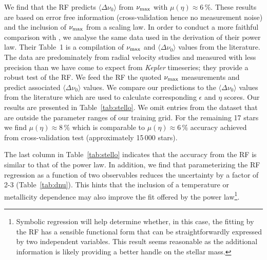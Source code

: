 We find that the RF predicts $\langle\Delta\nu_0\rangle$  from $\nu_{\rm{max}}$  with $\mu (\eta) \approx 6\,\%$. These results are based on error free information (cross-validation hence no measurement noise) and the inclusion of $\nu_{\rm{max}}$ from a scaling law. 
In order to conduct a more faithful comparison with \citet{2009MNRAS.400L..80S}, we analyse the same data used in the derivation of their power law.  
Their Table~1 is a compilation of  $\nu_{\rm{max}}$ and $\langle\Delta\nu_0\rangle$ values from the literature. The data are predominately from radial velocity studies and measured with less precision than we have come to expect from \emph{Kepler} timeseries; they provide a robust test of the RF. 
We feed the RF the quoted $\nu_{\rm{max}}$ measurements and predict associated $\langle\Delta\nu_0\rangle$ values. We compare our predictions to the $\langle\Delta\nu_0\rangle$ values from the literature which are used to calculate corresponding 
$\epsilon$ and $\eta$ scores. Our results are presented in Table~\ref{tab:stello}. 
We omit entries from  the \citet{2009MNRAS.400L..80S} dataset that are outside the parameter ranges of our training grid.
For the remaining 17 stars we find $\mu (\eta) \approx 8\,\%$ which is comparable to  $\mu (\eta) \approx 6\,\%$ accuracy achieved from cross-validation test (approximately 15\,000 stars).  


The last column in Table~\ref{tab:stello} indicates that the accuracy from the RF is similar to that of the power law. In addition, we find that parameterizing the RF regression as a function of two observables reduces the uncertainty by a factor of 2-3   (Table~\ref{tab:dnu}).
This hints that the inclusion of a temperature or metallicity dependence may also improve the fit offered by the power law\footnote{Symbolic regression will help determine whether, in this case, the fitting by the RF has a sensible functional form that can be straightforwardly expressed by two independent variables. This result seems reasonable as the additional information is likely providing a better handle on the stellar mass.}. 
 
